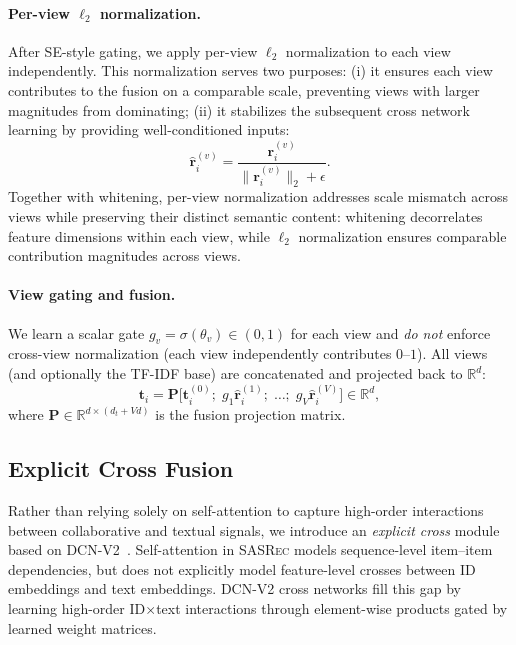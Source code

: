 \documentclass[sigconf,natbib=true,anonymous]{acmart}
\newcommand{\base}{\textsc{SASRec}\xspace}
\newcommand{\tfidf}{\textsc{TF-IDF}\xspace}
\begin{document}
\paragraph{Per-view $\ell_2$ normalization.}
After SE-style gating, we apply per-view $\ell_2$ normalization
to each view independently. This normalization serves two purposes:
(i) it ensures each view contributes to the fusion on a comparable
scale, preventing views with larger magnitudes from dominating;
(ii) it stabilizes the subsequent cross network learning by
providing well-conditioned inputs:
\begin{equation}
  \hat{\mathbf{r}}_i^{(v)} = \frac{\mathbf{r}_i^{(v)}}{\lVert \mathbf{r}_i^{(v)} \rVert_2 + \epsilon}.
\end{equation}
Together with whitening, per-view normalization addresses scale mismatch
across views while preserving their distinct semantic content: whitening
decorrelates feature dimensions within each view, while $\ell_2$
normalization ensures comparable contribution magnitudes across views.

\paragraph{View gating and fusion.}
We learn a scalar gate $g_v=\sigma(\theta_v)\in(0,1)$ for each
view and \emph{do not} enforce cross-view normalization (each
view independently contributes $0$--$1$). All views (and
optionally the \tfidf base) are concatenated and projected
back to $\mathbb{R}^d$:
\begin{equation}
  \mathbf{t}_i = \mathbf{P}\Big[\mathbf{t}_i^{(0)};\; g_1\hat{\mathbf{r}}_i^{(1)};\; \dots;\; g_V\hat{\mathbf{r}}_i^{(V)}\Big] \in \mathbb{R}^d,
\end{equation}
where $\mathbf{P} \in \mathbb{R}^{d \times (d_t + Vd)}$ is the fusion projection matrix.

\subsection{Explicit Cross Fusion}\label{sec:cross}
Rather than relying solely on self-attention to capture
high-order interactions between collaborative and textual
signals, we introduce an \emph{explicit cross} module based on
DCN-V2~\cite{wang2021dcnv2}. Self-attention in \base models
sequence-level item--item dependencies, but does not
explicitly model feature-level crosses between ID embeddings
and text embeddings. DCN-V2 cross networks fill this gap by
learning high-order ID$\times$text interactions through
element-wise products gated by learned weight matrices.
\end{document}
